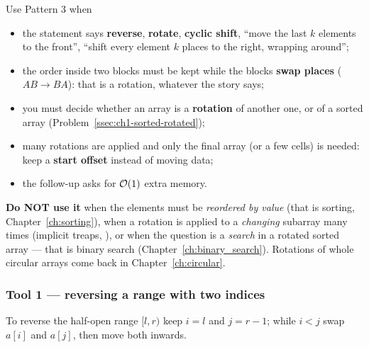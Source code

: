 Use Pattern 3 when
\begin{itemize}[leftmargin=*]
    \item the statement says \textbf{reverse}, \textbf{rotate}, \textbf{cyclic shift}, ``move the last $k$ elements to the front'', ``shift every element $k$ places to the right, wrapping around'';
    \item the order inside two blocks must be kept while the blocks \textbf{swap places} ($AB \to BA$): that is a rotation, whatever the story says;
    \item you must decide whether an array is a \textbf{rotation} of another one, or of a sorted array (Problem~\ref{ssec:ch1-sorted-rotated});
    \item many rotations are applied and only the final array (or a few cells) is needed: keep a \textbf{start offset} instead of moving data;
    \item the follow-up asks for $\mathcal{O}(1)$ extra memory.
\end{itemize}

\textbf{Do NOT use it} when the elements must be \emph{reordered by value} (that is sorting, Chapter~\ref{ch:sorting}), when a rotation is applied to a \emph{changing} subarray many times (implicit treaps, ), or when the question is a \emph{search} in a rotated sorted array --- that is binary search (Chapter~\ref{ch:binary_search}). Rotations of whole circular arrays come back in Chapter~\ref{ch:circular}.

\subsubsection*{Tool 1 --- reversing a range with two indices}

To reverse the half-open range $[l, r)$ keep $i = l$ and $j = r-1$; while $i < j$ swap $a[i]$ and $a[j]$, then move both inwards.

\begin{diagrambox}
\figcap{Reversing $[0,6)$ in place. After step $t$ the outer $t$ cells on each side are final (green).}
\end{diagrambox}

